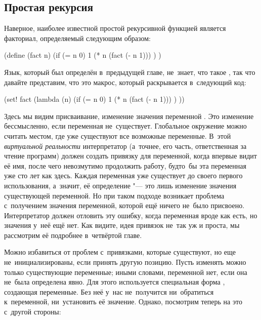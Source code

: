 \subsection{Простая рекурсия}\label{lisp1-2-omega/recusion/ssect:simple}

Наверное, наиболее известной простой рекурсивной функцией является факториал,
определяемый следующим образом:

\begin{code:lisp}
(define (fact n)
  (if (= n 0) 1
      (* n (fact (- n 1))) ) )
\end{code:lisp}

Язык, который был определён в~предыдущей главе, не~знает, что такое ,
так что давайте представим, что это макрос, который раскрывается в~следующий
код:

\begin{code:lisp}
(set! fact (lambda (n)
             (if (= n 0) 1
                 (* n (fact (- n 1))) ) ))
\end{code:lisp}

Здесь мы видим присваивание, изменение значения переменной . Это
изменение бессмысленно, если переменная  не~существует. Глобальное
окружение можно считать местом, где уже существуют все возможные переменные.
В~этой \emph{виртуальной реальности} интерпретатор (а~точнее, его часть,
ответственная за чтение программ) должен создать привязку для переменной, когда
впервые видит её имя, после чего невозмутимо продолжить работу, будто~бы эта
переменная уже сто лет как здесь. Каждая переменная уже существует до своего
первого использования, а~значит, её определение "--- это лишь изменение значения
существующей переменной. Но при таком подходе возникает проблема с~получением
значения переменной, которой ещё ничего не~было присвоено. Интерпретатор должен
отловить эту ошибку, когда переменная вроде как есть, но значения у~неё ещё нет.
Как видите, идея привязок не~так уж и проста, мы рассмотрим её подробнее
в~четвёртой главе. 

Можно избавиться от проблем с~привязками, которые существуют, но еще
не~инициализированы, если принять другую позицию. Пусть изменять можно только
существующие переменные; иными словами, переменной нет, если она не~была
определена явно. Для этого используется специальная форма ,
создающая переменные. Без неё у~нас не~получится ни~обратиться к~переменной,
ни~установить её значение. Однако, посмотрим теперь на это с~другой стороны:

